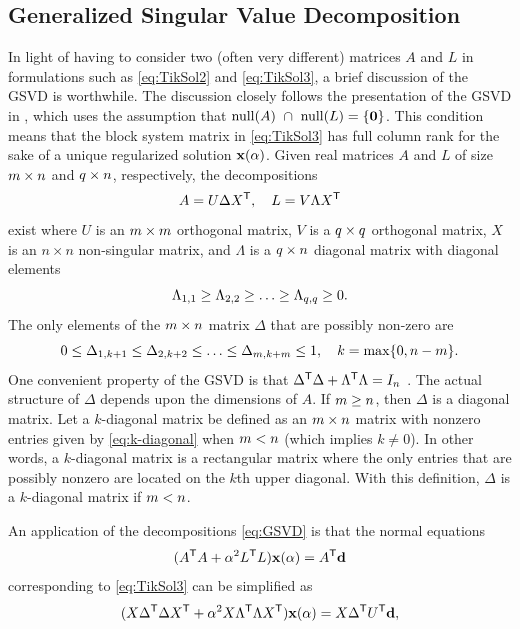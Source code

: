 \documentclass[12pt]{article}
\begin{document}
\subsection{Generalized Singular Value Decomposition} \label{sec:GSVD}
In light of having to consider two (often very different) matrices $A$ and $L$ in formulations such as \eqref{eq:TikSol2} and \eqref{eq:TikSol3}, a brief discussion of the GSVD is worthwhile. The discussion closely follows the presentation of the GSVD in \cite{ABT}, which uses the assumption that $\operatorname{null}(A) ~ \cap ~ \operatorname{null}(L) = \{\bm{0}\}$. This condition means that the block system matrix in \eqref{eq:TikSol3} has full column rank for the sake of a unique regularized solution $\mathbf{x}(\alpha)$. Given real matrices $A$ and $L$ of size $m \times n$ and $q \times n$, respectively, the decompositions
\begin{equation}
\label{eq:GSVD}
A = U\Delta{X}^\mathsf{T}, \quad L = V\Lambda{X}^\mathsf{T}
\end{equation}
exist where $U$ is an $m \times m$ orthogonal matrix, $V$ is a $q \times q$ orthogonal matrix, $X$ is an $n \times n$ non-singular matrix, and $\Lambda$ is a $q \times n$ diagonal matrix with diagonal elements
\[\Lambda_{1,1} \geq \Lambda_{2,2} \geq \ldots \geq \Lambda_{q,q} \geq 0.\]
The only elements of the $m \times n$ matrix $\Delta$ that are possibly non-zero are
\begin{equation}
\label{eq:k-diagonal}
 0 \leq \Delta_{1,k+1} \leq \Delta_{2,k+2} \leq \ldots \leq \Delta_{m,k+m} \leq 1, \quad k = \max \{0,n - m\}.
\end{equation}
One convenient property of the GSVD is that ${\Delta}^\mathsf{T}\Delta + {\Lambda}^\mathsf{T}\Lambda = I_n$ \cite[p.~104]{ABT}. The actual structure of $\Delta$ depends upon the dimensions of $A$. If $m \geq n$, then $\Delta$ is a diagonal matrix. Let a $k$-diagonal matrix be defined as an $m \times n$ matrix with nonzero entries given by \eqref{eq:k-diagonal} when $m < n$ (which implies $k \neq 0$). In other words, a $k$-diagonal matrix is a rectangular matrix where the only entries that are possibly nonzero are located on the $k$th upper diagonal. With this definition, $\Delta$ is a $k$-diagonal matrix if $m < n$. \par 
An application of the decompositions \eqref{eq:GSVD} is that the normal equations 
\[({A}^\mathsf{T}A + \alpha^2 {L}^\mathsf{T}L)\mathbf{x}(\alpha) = {A}^\mathsf{T}\mathbf{d}\] corresponding to \eqref{eq:TikSol3} can be simplified as 
\[(X{\Delta}^\mathsf{T}\Delta{X}^\mathsf{T} + \alpha^2 X{\Lambda}^\mathsf{T}\Lambda{X}^\mathsf{T})\mathbf{x}(\alpha) = X{\Delta}^\mathsf{T}{U}^\mathsf{T}\mathbf{d},\]
\end{document}
